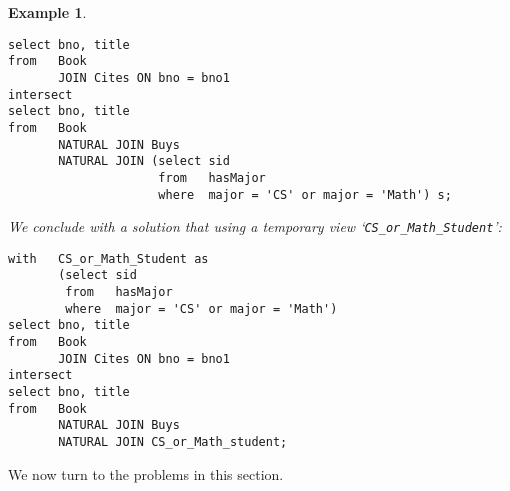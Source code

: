 \documentclass[11pt]{article}
\newtheorem{example}{Example}
\begin{document}
\begin{example}
\begin{description}
{\small
\begin{verbatim}
select bno, title
from   Book 
       JOIN Cites ON bno = bno1
intersect
select bno, title
from   Book 
       NATURAL JOIN Buys 
       NATURAL JOIN (select sid 
                     from   hasMajor
                     where  major = 'CS' or major = 'Math') s;
\end{verbatim}
}                    



We conclude with a solution that using a temporary view `{\tt CS\_or\_Math\_Student}':
{\small
\begin{verbatim}
with   CS_or_Math_Student as
       (select sid 
        from   hasMajor
        where  major = 'CS' or major = 'Math')
select bno, title
from   Book 
       JOIN Cites ON bno = bno1
intersect
select bno, title
from   Book 
       NATURAL JOIN Buys 
       NATURAL JOIN CS_or_Math_student;
\end{verbatim}
}                    


\end{description}
\end{example}



We now turn to the problems in this section.
\end{document}

